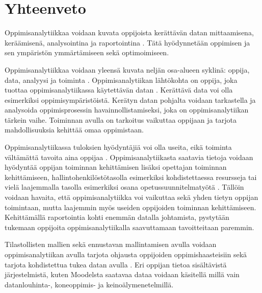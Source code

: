 \chapter{Yhteenveto\label{yhteenveto}}
\color{red}

Oppimisanalytiikkaa voidaan kuvata oppijoista kerättävän datan mittaamisena, keräämisenä, analysointina ja raportointina \citep{siemensLearningAnalyticsEmergence2013,clowLearningAnalyticsCycle2012}. Tätä hyödynnetään oppimisen ja sen ympäristön ymmärtämiseen sekä optimoimiseen.

Oppimisanalytiikkaa voidaan yleensä kuvata neljän osa-alueen syklinä: oppija, data, analyysi ja toiminta \citep{clowLearningAnalyticsCycle2012}. Oppimisanalytiikan lähtökohta on oppija, joka tuottaa oppimisanalytiikassa käytettävän datan \citep{wolffImprovingRetentionPredicting2013}. Kerättävä data voi olla esimerkiksi oppimisympäristöistä. Kerätyn datan pohjalta voidaan tarkastella ja analysoida oppimisprosessin havainnollistamiseksi, joka on oppimisanalytiikan tärkein vaihe. Toiminnan avulla on tarkoitus vaikuttaa oppijaan ja tarjota mahdollisuuksia kehittää omaa oppimistaan.

Oppimisanalytiikassa tuloksien hyödyntäjiä voi olla useita, eikä toiminta vältämättä tavoita aina oppijaa \citep{clowLearningAnalyticsCycle2012}. Oppimisanalytiikasta saatavia tietoja voidaan hyödyntää oppijan toiminnan kehittämisen lisäksi opettajan toiminnan kehittämiseen, hallintohenkilöstötasolla esimerkiksi kohdistettaessa resursseja tai vielä laajemmalla tasolla esimerkiksi osana opetussuunnitelmatyötä \citep{clowOverviewLearningAnalytics2013}. Tällöin voidaan havaita, että oppimisanalytiikka voi vaikuttaa sekä yhden tietyn oppijan toimintaan, mutta laajemmin myös useiden oppijoiden toiminnan kehittämiseen. Kehittämällä raportointia kohti enemmän datalla johtamista, pystytään tukemaan oppijoita oppimisanalytiikalla saavuttamaan tavoitteitaan paremmin.


Tilastollisten mallien sekä ennustavan mallintamisen avulla voidaan oppimisanalytiikan avulla tarjota ohjausta oppijoiden oppimishaasteisiin sekä tarjota kohdistettua tukea datan avulla \citep{ranjeethSurveyPredictiveModels2020}. Eri oppijan tietoa sisältävistä järjestelmistä, kuten Moodelsta saatavaa dataa voidaan käsitellä millä vain datanlouhinta-, koneoppimis- ja keinoälymenetelmillä.


